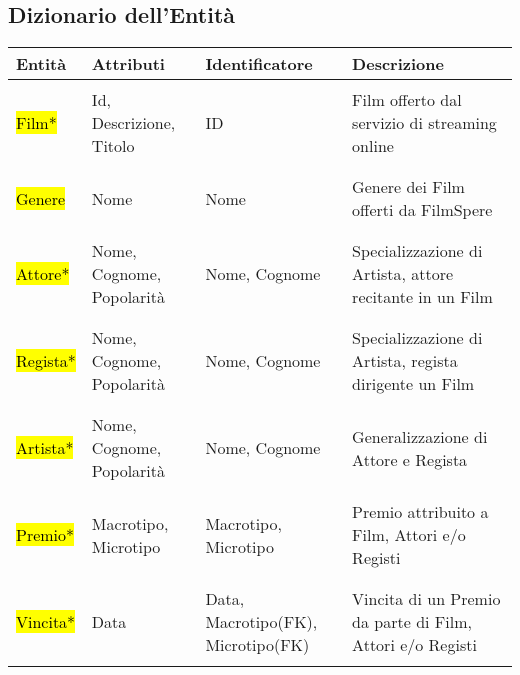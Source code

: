\documentclass{article}
\begin{document}
\subsection{Dizionario dell'Entità}
\begin{tabular}{|C{1.9cm}|C{3.2cm}|C{2.3cm}|C{4cm}|}
\hline
 \textbf{Entità}& \textbf{Attributi}& \textbf{Identificatore}& \textbf{Descrizione}\\ 
\hline
\hline
& & & \\
 \hl{Film*}   & Id,  Descrizione, Titolo & ID &   Film offerto dal servizio di streaming online \\
& & & \\    
\hline
& & & \\
 \hl{Genere} & Nome & Nome & Genere dei Film offerti da FilmSpere \\
 & & & \\
\hline
& & & \\
 \hl{Attore*} & Nome, Cognome, Popolarità & Nome, Cognome & Specializzazione di Artista, attore recitante in un Film \\
& & & \\
\hline
& & & \\
 \hl{Regista*} & Nome, Cognome, Popolarità & Nome, Cognome & Specializzazione di Artista, regista dirigente un Film \\
& & & \\
\hline
& & & \\
 \hl{Artista*} & Nome, Cognome, Popolarità & Nome, Cognome  & Generalizzazione di Attore e Regista \\
& & & \\
\hline
& & & \\
 \hl{Premio*} & Macrotipo, Microtipo & Macrotipo, Microtipo  & Premio attribuito a Film, Attori e/o Registi \\
& & & \\
\hline
& & & \\
 \hl{Vincita*} & Data & Data, Macrotipo(FK), Microtipo(FK) & Vincita di un Premio da parte di Film, Attori e/o Registi \\
& & & \\
\hline
\end{tabular}
\newpage
%
%
%
%
%
%
%
%
\end{document}
